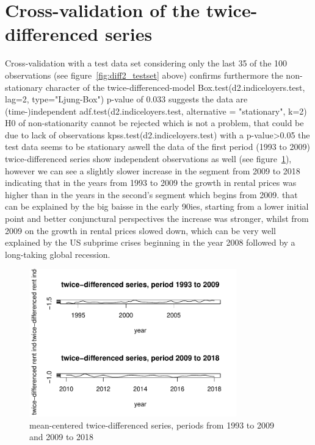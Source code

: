 \documentclass[11pt,a4paper]{article}
\begin{document}
\section{Cross-validation of the twice-differenced series}
Cross-validation with a test data set considering only the last 35 of the 100 observations (see figure~\ref{fig:diff2_testset} above) confirms furthermore the non-stationary character of the twice-differenced-model 
Box.test(d2.indiceloyers.test, lag=2, type="Ljung-Box") p-value of 0.033 suggests the data are (time-)independent
adf.test(d2.indiceloyers.test, alternative = "stationary", k=2)  H0 of non-stationarity cannot be rejected which is not a problem, that could be due to lack of observations
kpss.test(d2.indiceloyers.test)  with a p-value>0.05 the test data seems to be stationary aswell
the data of the first period (1993 to 2009) twice-differenced series show independent observations as well (see figure~\ref{fig:diff2_test_train}), however we can see a slightly slower increase in the segment from 2009 to 2018 indicating that in the years from 1993 to 2009 the growth in rental prices was higher than in the years in the second's segment which begins from 2009. that can be explained by the big baisse in the early 90ies, starting from a lower initial point and better conjunctural perspectives the increase was stronger, whilst from 2009 on the growth in rental prices slowed down, which can be very well explained by the US subprime crises beginning in the year 2008 followed by a long-taking global recession.
\begin{figure}[!htb]
\centering
\includegraphics[angle=0,
width=0.8\textwidth]{diff2_test_train}
\caption{mean-centered twice-differenced series, periods from 1993 to 2009 and 2009 to 2018
\label{fig:diff2_test_train}}
\end{figure}
\end{document}
